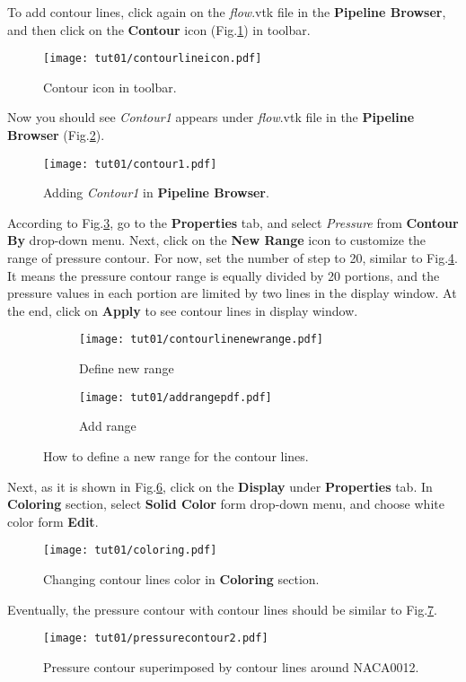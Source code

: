 To add contour lines, click again on the \textit{flow}.vtk file in the \textbf{Pipeline Browser}, and then click on the \textbf{Contour} icon (Fig.\ref{fig:contour_icon}) in toolbar.
\begin{figure}[htbp]
    \centering
    \texttt{[image: tut01/contourlineicon.pdf]}
    \caption{Contour icon in toolbar.}
    \label{fig:contour_icon}
\end{figure}
Now you should see \textit{Contour1} appears under \textit{flow}.vtk file in the \textbf{Pipeline Browser} (Fig.\ref{fig:contour1}).
\begin{figure}[htbp]
    \centering
    \texttt{[image: tut01/contour1.pdf]}
    \caption{Adding \textit{Contour1} in \textbf{Pipeline Browser}.}
    \label{fig:contour1}
\end{figure}
According to Fig.\ref{fig:contourby a}, go to the \textbf{Properties} tab, and select \textit{Pressure} from \textbf{Contour By} drop-down menu. Next, click on the \textbf{New Range} icon to customize the range of pressure contour. For now, set the number of step to 20, similar to Fig.\ref{fig:contourby b}. It means the pressure contour range is equally divided by 20 portions, and the pressure values in each portion are limited by two lines in the display window. At the end, click on \textbf{Apply} to see contour lines in display window.
\begin{figure}[htbp]
    \centering
     \begin{subfigure}[b]{.4\textwidth}
         \centering
         \texttt{[image: tut01/contourlinenewrange.pdf]}
         \caption{Define new range}
         \label{fig:contourby a}
     \end{subfigure}
     \hfill
     \begin{subfigure}[b]{.4\textwidth}
         \centering
         \texttt{[image: tut01/addrangepdf.pdf]}
         \caption{Add range}
         \label{fig:contourby b}
     \end{subfigure}     
    \caption{How to define a new range for the contour lines.}
    \label{fig:contourby}
\end{figure}
Next, as it is shown in Fig.\ref{fig:colorby2}, click on the \textbf{Display} under \textbf{Properties} tab. In \textbf{Coloring} section, select \textbf{Solid Color} form drop-down menu, and choose white color form \textbf{Edit}.
\begin{figure}[htbp]
    \centering
    \texttt{[image: tut01/coloring.pdf]}
    \caption{Changing contour lines color in \textbf{Coloring} section.}
    \label{fig:colorby2}
\end{figure}
Eventually, the pressure contour with contour lines should be similar to Fig.\ref{fig:pressure_contour_lines}.
\begin{figure}[htbp]
    \centering
    \texttt{[image: tut01/pressurecontour2.pdf]}
    \caption{Pressure contour superimposed by contour lines around NACA0012.}
    \label{fig:pressure_contour_lines}
\end{figure}
